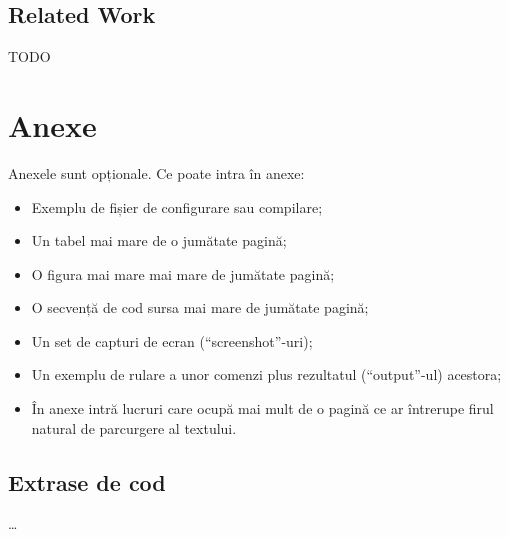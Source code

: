 \documentclass[12pt,a4paper]{report}
\begin{document}
\section{Related Work}

TODO







\chapter*{Anexe}

Anexele sunt opționale.
Ce poate intra în anexe:
\begin{itemize}
\item	Exemplu de fișier de configurare sau compilare;
\item	Un tabel mai mare de o jumătate pagină;
\item	O figura mai mare mai mare de jumătate pagină;
\item	O secvență de cod sursa mai mare de jumătate pagină;
\item	Un set de capturi de ecran (``screenshot''-uri);
\item	Un exemplu de rulare a unor comenzi plus rezultatul (``output''-ul) acestora;
\item 	În anexe intră lucruri care ocupă mai mult de o pagină ce ar întrerupe firul natural de parcurgere al textului.
\end{itemize}

\begin{appendices}

\chapter{Extrase de cod} %
\ldots


\end{appendices}
\end{document}
